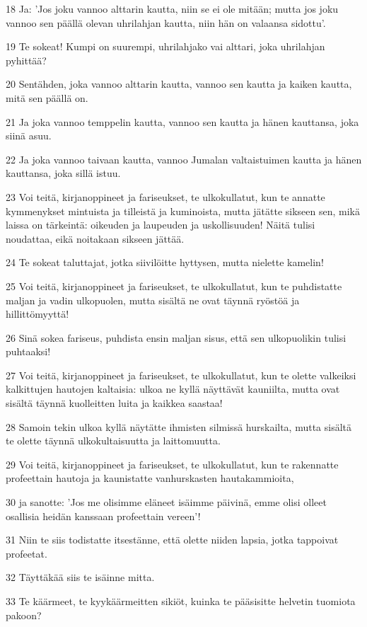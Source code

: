 \par 18 Ja: 'Jos joku vannoo alttarin kautta, niin se ei ole mitään; mutta jos joku vannoo sen päällä olevan uhrilahjan kautta, niin hän on valaansa sidottu'.
\par 19 Te sokeat! Kumpi on suurempi, uhrilahjako vai alttari, joka uhrilahjan pyhittää?
\par 20 Sentähden, joka vannoo alttarin kautta, vannoo sen kautta ja kaiken kautta, mitä sen päällä on.
\par 21 Ja joka vannoo temppelin kautta, vannoo sen kautta ja hänen kauttansa, joka siinä asuu.
\par 22 Ja joka vannoo taivaan kautta, vannoo Jumalan valtaistuimen kautta ja hänen kauttansa, joka sillä istuu.
\par 23 Voi teitä, kirjanoppineet ja fariseukset, te ulkokullatut, kun te annatte kymmenykset mintuista ja tilleistä ja kuminoista, mutta jätätte sikseen sen, mikä laissa on tärkeintä: oikeuden ja laupeuden ja uskollisuuden! Näitä tulisi noudattaa, eikä noitakaan sikseen jättää.
\par 24 Te sokeat taluttajat, jotka siivilöitte hyttysen, mutta nielette kamelin!
\par 25 Voi teitä, kirjanoppineet ja fariseukset, te ulkokullatut, kun te puhdistatte maljan ja vadin ulkopuolen, mutta sisältä ne ovat täynnä ryöstöä ja hillittömyyttä!
\par 26 Sinä sokea fariseus, puhdista ensin maljan sisus, että sen ulkopuolikin tulisi puhtaaksi!
\par 27 Voi teitä, kirjanoppineet ja fariseukset, te ulkokullatut, kun te olette valkeiksi kalkittujen hautojen kaltaisia: ulkoa ne kyllä näyttävät kauniilta, mutta ovat sisältä täynnä kuolleitten luita ja kaikkea saastaa!
\par 28 Samoin tekin ulkoa kyllä näytätte ihmisten silmissä hurskailta, mutta sisältä te olette täynnä ulkokultaisuutta ja laittomuutta.
\par 29 Voi teitä, kirjanoppineet ja fariseukset, te ulkokullatut, kun te rakennatte profeettain hautoja ja kaunistatte vanhurskasten hautakammioita,
\par 30 ja sanotte: 'Jos me olisimme eläneet isäimme päivinä, emme olisi olleet osallisia heidän kanssaan profeettain vereen'!
\par 31 Niin te siis todistatte itsestänne, että olette niiden lapsia, jotka tappoivat profeetat.
\par 32 Täyttäkää siis te isäinne mitta.
\par 33 Te käärmeet, te kyykäärmeitten sikiöt, kuinka te pääsisitte helvetin tuomiota pakoon?
